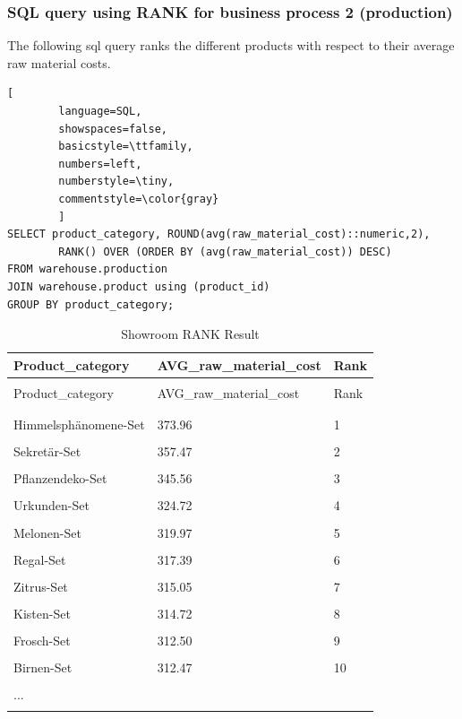 \documentclass[letterpaper,12pt]{article}
\begin{document}
\subsubsection{SQL query using RANK for business process 2 (production)}

The following sql query ranks the different products with respect to their average raw material costs.

\begin{lstlisting}[
        language=SQL,
        showspaces=false,
        basicstyle=\ttfamily,
        numbers=left,
        numberstyle=\tiny,
        commentstyle=\color{gray}
        ]
SELECT product_category, ROUND(avg(raw_material_cost)::numeric,2),
        RANK() OVER (ORDER BY (avg(raw_material_cost)) DESC)
FROM warehouse.production
JOIN warehouse.product using (product_id)
GROUP BY product_category;
\end{lstlisting}

\begingroup
\renewcommand\arraystretch{0.5}
\begin{longtable}{p{5cm}p{5cm}p{2cm}}
        \caption{Showroom RANK Result} \\
	Product\_category & AVG\_raw\_material\_cost & Rank \\
        \endfirsthead \\
        Product\_category & AVG\_raw\_material\_cost & Rank \\
        \endhead \\
        \hline \\
        Himmelsphänomene-Set & 373.96 & 1 \\
        \hline \\
        Sekretär-Set & 357.47 & 2 \\
        \hline \\
        Pflanzendeko-Set & 345.56 & 3 \\
        \hline \\
        Urkunden-Set & 324.72 & 4 \\
        \hline \\
        Melonen-Set & 319.97 & 5 \\
        \hline \\
        Regal-Set & 317.39 & 6 \\
        \hline \\
        Zitrus-Set & 315.05 & 7 \\
        \hline \\
        Kisten-Set & 314.72 & 8 \\
        \hline \\
        Frosch-Set & 312.50 & 9 \\
        \hline \\
        Birnen-Set & 312.47 & 10 \\
        \hline \\
        ... & & \\
        \hline \\
\end{longtable} 
\endgroup
\end{document}
